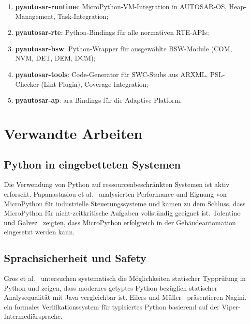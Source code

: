 ﻿\documentclass[12pt,a4paper,twoside]{article}
\begin{document}
\begin{enumerate}
  \item \textbf{pyautosar-runtime}: MicroPython-VM-Integration in AUTOSAR-OS,
        Heap-Manage\-ment, Task-Integration;
  \item \textbf{pyautosar-rte}: Python-Bindings für alle normativen RTE-APIs;
  \item \textbf{pyautosar-bsw}: Python-Wrapper für ausgewählte BSW-Module
        (COM, NVM, DET, DEM, DCM);
  \item \textbf{pyautosar-tools}: Code-Generator für SWC-Stubs aus ARXML,
        PSL-Checker (Lint-Plugin), Coverage-Integration;
  \item \textbf{pyautosar-ap}: ara-Bindings für die Adaptive Platform.
\end{enumerate}

\section{Verwandte Arbeiten}
\label{sec:verwandte}

\subsection{Python in eingebetteten Systemen}

Die Verwendung von Python auf ressourcenbeschränkten Systemen ist
aktiv erforscht. Papanastasiou et al.~\cite{papanastasiou2021micropython} analysierten
Performance und Eignung von MicroPython für industrielle Steuerungssysteme
und kamen zu dem Schluss, dass MicroPython für nicht-zeitkritische Aufgaben
vollständig geeignet ist. Tolentino und Galvez~\cite{tolentino2019micropython} zeigten,
dass MicroPython erfolgreich in der Gebäudeautomation eingesetzt werden kann.

\subsection{Sprachsicherheit und Safety}

Gros et al.~\cite{gros2021python_types} untersuchen systematisch die Möglichkeiten
statischer Typprüfung in Python und zeigen, dass modernes getyptes Python
bezüglich statischer Analysequalität mit Java vergleichbar ist.
Eilers und Müller~\cite{nagini2018} präsentieren Nagini, ein formales Verifikationssystem
für typisiertes Python basierend auf der Viper-Intermediärsprache.
\end{document}

